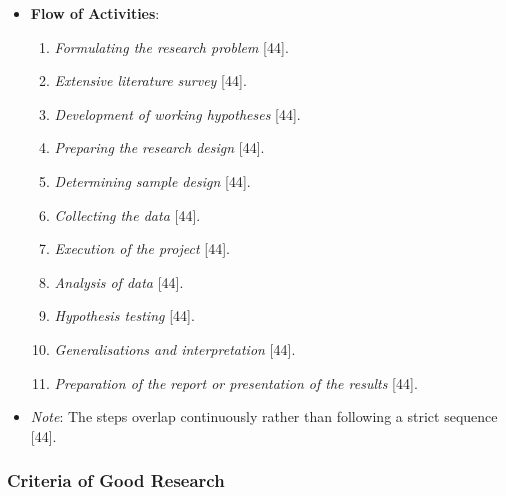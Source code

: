\documentclass[
]{article}
\providecommand{\tightlist}{%
  \setlength{\itemsep}{0pt}\setlength{\parskip}{0pt}}
\begin{document}
\begin{itemize}
\tightlist
\item
  \textbf{Flow of Activities}:

  \begin{enumerate}
  \def\labelenumi{\arabic{enumi}.}
  \tightlist
  \item
    \emph{Formulating the research problem} {[}44{]}.
  \item
    \emph{Extensive literature survey} {[}44{]}.
  \item
    \emph{Development of working hypotheses} {[}44{]}.
  \item
    \emph{Preparing the research design} {[}44{]}.
  \item
    \emph{Determining sample design} {[}44{]}.
  \item
    \emph{Collecting the data} {[}44{]}.
  \item
    \emph{Execution of the project} {[}44{]}.
  \item
    \emph{Analysis of data} {[}44{]}.
  \item
    \emph{Hypothesis testing} {[}44{]}.
  \item
    \emph{Generalisations and interpretation} {[}44{]}.
  \item
    \emph{Preparation of the report or presentation of the results}
    {[}44{]}.
  \end{enumerate}
\item
  \emph{Note}: The steps overlap continuously rather than following a
  strict sequence {[}44{]}.
\end{itemize}

\subsubsection{Criteria of Good
Research}\label{criteria-of-good-research}
\end{document}
